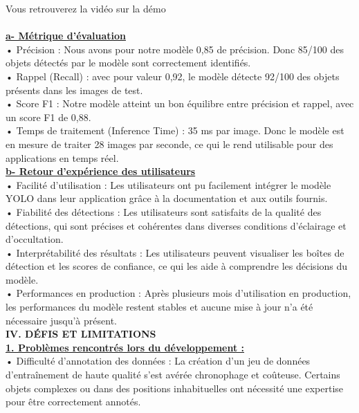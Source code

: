 \documentclass[a4paper, 13px]{article}
\begin{document}
Vous retrouverez la vidéo sur la démo\\
\\

{\bfseries \underline{a-	Métrique d’évaluation}}\\

•	Précision : Nous avons pour notre modèle 0,85 de précision. Donc 85/100 des objets détectés par le modèle sont correctement identifiés.\\
•	Rappel (Recall) : avec pour valeur 0,92, le modèle détecte 92/100 des objets présents dans les images de test.\\ 
•	Score F1 : Notre modèle atteint un bon équilibre entre précision et rappel, avec un score F1 de 0,88.\\
•	Temps de traitement (Inference Time) : 35 ms par image. Donc le modèle est en mesure de traiter 28 images par seconde, ce qui le rend utilisable pour des applications en temps réel.\\

{\bfseries \underline{b-	Retour d'expérience des utilisateurs}} \\

   
•	Facilité d'utilisation : Les utilisateurs ont pu facilement intégrer le modèle YOLO dans leur application grâce à la documentation et aux outils fournis.\\
•	Fiabilité des détections : Les utilisateurs sont satisfaits de la qualité des détections, qui sont précises et cohérentes dans diverses conditions d'éclairage et d'occultation.\\
•	Interprétabilité des résultats : Les utilisateurs peuvent visualiser les boîtes de détection et les scores de confiance, ce qui les aide à comprendre les décisions du modèle.\\
•	Performances en production : Après plusieurs mois d'utilisation en production, les performances du modèle restent stables et aucune mise à jour n'a été nécessaire jusqu'à présent. \\

{\bfseries \MakeUppercase{ IV. Défis et limitations}}\\

{\bfseries \underline{1.	Problèmes rencontrés lors du développement :}}\\

•	Difficulté d'annotation des données : La création d'un jeu de données d'entraînement de haute qualité s'est avérée chronophage et coûteuse. Certains objets complexes ou dans des positions inhabituelles ont nécessité une expertise pour être correctement annotés.\\
\end{document}
